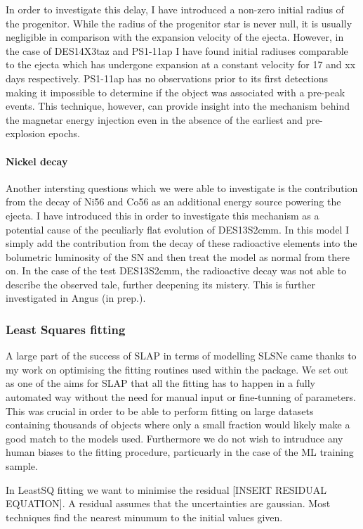 In order to investigate this delay, I have introduced a non-zero initial radius of the progenitor. While the radius of the progenitor star is never null, it is usually negligible in comparison with the expansion velocity of the ejecta. However, in the case of DES14X3taz and PS1-11ap I have found initial radiuses comparable to the ejecta which has undergone expansion at a constant velocity for 17 and xx days respectively. PS1-11ap has no observations prior to its first detections making it impossible to determine if the object was associated with a pre-peak events. This technique, however, can provide insight into the mechanism behind the magnetar energy injection even in the absence of the earliest and pre-explosion epochs.

\paragraph{Nickel decay}
Another intersting questions which we were able to investigate is the contribution from the decay of Ni56 and Co56 as an additional energy source powering the ejecta. I have introduced this in order to investigate this mechanism as a potential cause of the peculiarly flat evolution of DES13S2cmm. In this model I simply add the contribution from the decay of these radioactive elements into the bolumetric luminosity of the SN and then treat the model as normal from there on. In the case of the test DES13S2cmm, the radioactive decay was not able to describe the observed tale, further deepening its mistery. This is further investigated in Angus (in prep.).

\subsubsection{Least Squares fitting}
A large part of the success of SLAP in terms of modelling SLSNe came thanks to my work on optimising the fitting routines used within the package. We set out as one of the aims for \textsc{SLAP} that all the fitting has to happen in a fully automated way without the need for manual input or fine-tunning of parameters. This was crucial in order to be able to perform fitting on large datasets containing thousands of objects where only a small fraction would likely make a good match to the models used. Furthermore we do not wish to intruduce any human biases to the fitting procedure, particuarly in the case of the ML training sample.

In LeastSQ fitting we want to minimise the residual [INSERT RESIDUAL EQUATION]. A residual assumes that the uncertainties are gaussian. Most techniques find the nearest minumum to the initial values given.

